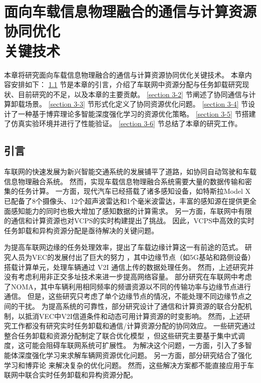 \chapter[面向车载信息物理融合的通信与计算资源协同优化关键技术]{面向车载信息物理融合的通信与计算资源协同优化\\关键技术}
本章将研究面向车载信息物理融合的通信与计算资源协同优化关键技术。
本章内容安排如下：
\ref{section 3-1} 节是本章的引言，介绍了车联网中资源分配与任务卸载研究现状、目前研究的不足，以及本章的主要贡献。
\ref{section 3-2} 节阐述了协同通信与计算卸载场景。
\ref{section 3-3} 节形式化定义了协同资源优化问题。
\ref{section 3-4} 节设计了一种基于博弈理论多智能深度强化学习的资源优化策略。
\ref{section 3-5} 节搭建了仿真实验环境并进行了性能验证。
\ref{section 3-6} 节总结了本章的研究工作。

\section{引言}\label{section 3-1}

车联网的快速发展为新兴智能交通系统的发展铺平了道路，如协同自动驾驶\cite{bagheri20215g}和车载信息物理融合系统\cite{mugabarigira2023context}。
然而，实现车载信息物理融合系统需要大量的数据传输和密集的任务计算。
一方面，现代汽车已经搭载了诸多感知设备，如特斯拉Model X已配备了8个摄像头、12个超声波雷达和1个毫米波雷达，丰富的感知源在提供更全面感知能力的同时也极大增加了感知数据的计算需求。
另一方面，车联网中有限的通信和计算资源也对VCPS的实时构建提出了挑战。
因此，VCPS中高效的实时任务卸载和异构资源分配是亟待解决的关键问题。

为提高车联网边缘的任务处理效率，提出了车载边缘计算\cite{lang2022cooperative}这一有前途的范式。
研究人员为VEC的发展付出了巨大的努力 \cite{liu2021fog, dai2021edge, zhang2022digital, liu2020adaptive, liu2018coding}，其中边缘节点（如5G基站和路侧设备）搭载计算单元，处理车辆通过 V2I 通信上传的数据处理任务。
然而，上述研究并没有考虑利用非正交多址\cite{islam2017power}技术来进一步提高网络容量。
部分研究在车联网中考虑了NOMA\cite{patel2021performance, zhang2021centralized, zhu2021decentralized, liu2019energy}，其中车辆利用相同频率的频谱资源以不同的传输功率与边缘节点进行通信。
但是，这些研究只考虑了单个边缘节点的情况，不能处理不同边缘节点之间的干扰。
为提高系统的可靠性，部分研究设计了通信和计算资源的联合分配机制，以抵消VEC中V2I信道条件和动态可用计算资源的时变影响\cite{liu2021rtds, liu2022a, chen2020robust, liu2014temporal, liu2016cooperative}。
然而，上述研究工作都没有研究实时任务卸载和通信/计算资源分配的协同效应。
一些研究通过整合任务卸载和资源分配制定了联合优化模型 \cite{dai2021asynchronous, dai2022a}，但这些研究主要基于集中式调度，这可能会阻碍车联网系统可扩展性。
为解决这个问题，一方面，引入了多智能体深度强化学习\cite{kumar2022multi}来求解车辆网资源优化问题\cite{alam2022multi, zhang2021adaptive, nie2021semi}。
另一方面，部分研究结合了强化学习和博弈论 \cite{zheng2022stackelberg, albaba2021driver, rajeswaran2020a}来解决复杂的优化问题。
然而，这些解决方案都不能直接应用于车联网中联合实时任务卸载和异构资源分配。

